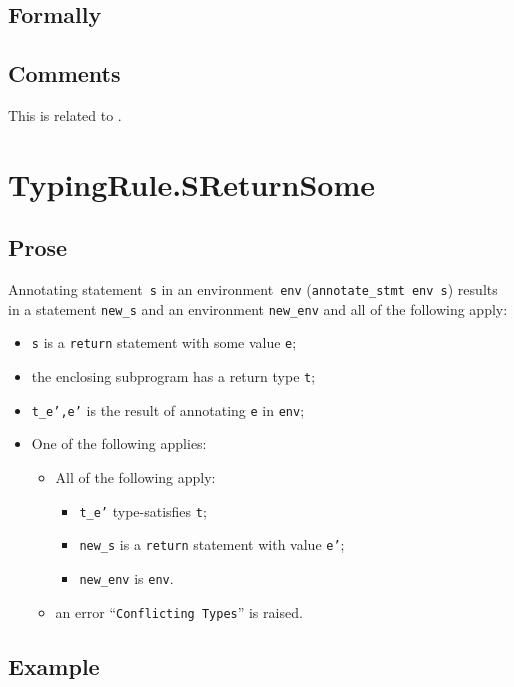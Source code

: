 \documentclass{book}
\begin{document}
\begin{emptyformal}
    \subsection{Formally}
\end{emptyformal}

\subsection{Comments}
    This is related to .

\section{TypingRule.SReturnSome \label{sec:TypingRule.SReturnSome}}

  \subsection{Prose}
Annotating statement~\texttt{s} in an environment~\texttt{env}
(\texttt{annotate\_stmt env s}) results in a statement \texttt{new\_s} and an
environment \texttt{new\_env} and all of the following apply:
   \begin{itemize}
   \item \texttt{s} is a \texttt{return} statement with some value \texttt{e};
   \item the enclosing subprogram has a return type \texttt{t};
   \item \texttt{t\_e',e'} is the result of annotating \texttt{e} in \texttt{env};
   \item One of the following applies:
     \begin{itemize}
     \item All of the following apply:
       \begin{itemize}
       \item \texttt{t\_e'} type-satisfies \texttt{t};
       \item \texttt{new\_s} is a \texttt{return} statement with value \texttt{e'};
       \item \texttt{new\_env} is \texttt{env}.
       \end{itemize}
     \item an error ``\texttt{Conflicting Types}'' is raised.
     \end{itemize}
   \end{itemize}

  \subsection{Example}
\end{document}
